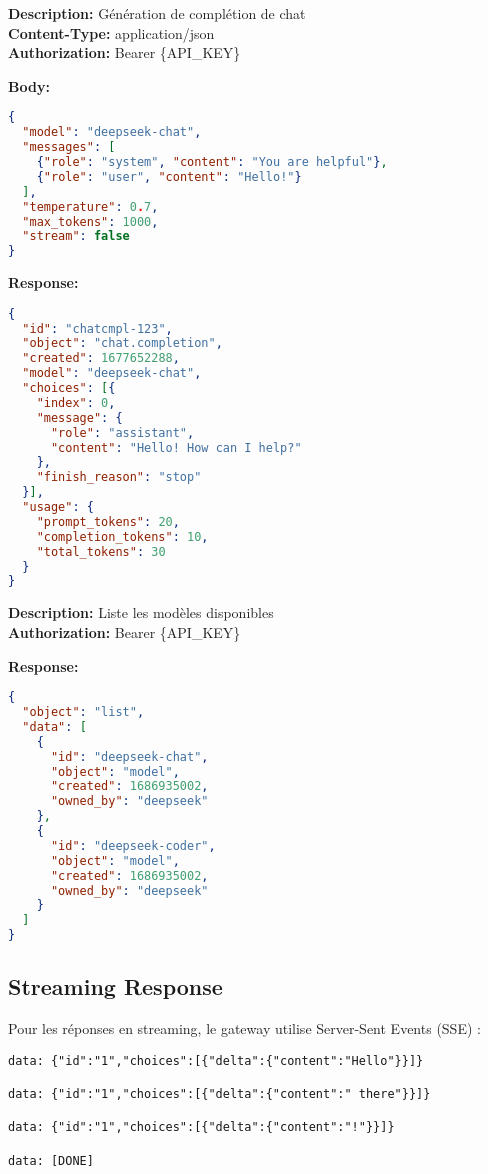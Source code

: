\documentclass[12pt,a4paper]{article}
\begin{document}
\begin{tcolorbox}[title=POST /v1/chat/completions, colback=blue!5]
\textbf{Description:} Génération de complétion de chat\\
\textbf{Content-Type:} application/json\\
\textbf{Authorization:} Bearer \{API\_KEY\}

\textbf{Body:}
\begin{lstlisting}[language=json]
{
  "model": "deepseek-chat",
  "messages": [
    {"role": "system", "content": "You are helpful"},
    {"role": "user", "content": "Hello!"}
  ],
  "temperature": 0.7,
  "max_tokens": 1000,
  "stream": false
}
\end{lstlisting}

\textbf{Response:}
\begin{lstlisting}[language=json]
{
  "id": "chatcmpl-123",
  "object": "chat.completion",
  "created": 1677652288,
  "model": "deepseek-chat",
  "choices": [{
    "index": 0,
    "message": {
      "role": "assistant",
      "content": "Hello! How can I help?"
    },
    "finish_reason": "stop"
  }],
  "usage": {
    "prompt_tokens": 20,
    "completion_tokens": 10,
    "total_tokens": 30
  }
}
\end{lstlisting}
\end{tcolorbox}

\begin{tcolorbox}[title=GET /v1/models, colback=green!5]
\textbf{Description:} Liste les modèles disponibles\\
\textbf{Authorization:} Bearer \{API\_KEY\}

\textbf{Response:}
\begin{lstlisting}[language=json]
{
  "object": "list",
  "data": [
    {
      "id": "deepseek-chat",
      "object": "model",
      "created": 1686935002,
      "owned_by": "deepseek"
    },
    {
      "id": "deepseek-coder",
      "object": "model",
      "created": 1686935002,
      "owned_by": "deepseek"
    }
  ]
}
\end{lstlisting}
\end{tcolorbox}

\subsection{Streaming Response}

Pour les réponses en streaming, le gateway utilise Server-Sent Events (SSE) :

\begin{lstlisting}
data: {"id":"1","choices":[{"delta":{"content":"Hello"}}]}

data: {"id":"1","choices":[{"delta":{"content":" there"}}]}

data: {"id":"1","choices":[{"delta":{"content":"!"}}]}

data: [DONE]
\end{lstlisting}
\end{document}
